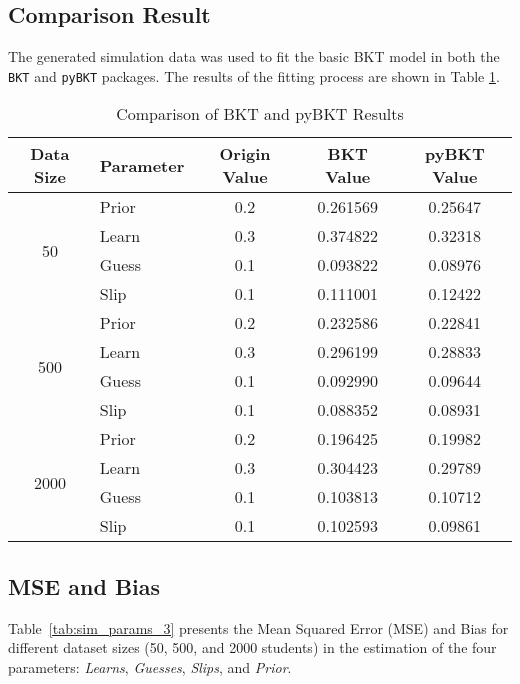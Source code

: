 \documentclass{article}
\begin{document}
\subsection{Comparison Result}
The generated simulation data was used to fit the basic BKT model in both the \texttt{BKT} and \texttt{pyBKT} packages. The results of the fitting process are shown in Table \ref{tab:bkt-comparison}.
\begin{table}[H]
\centering
\caption{Comparison of BKT and pyBKT Results}
\label{tab:bkt-comparison}
\begin{tabular}{@{}clccc@{}}
\toprule
\textbf{Data Size} & \textbf{Parameter} & \textbf{Origin Value} & \textbf{BKT Value} & \textbf{pyBKT Value} \\
\midrule
\multirow{4}{*}{50} 
    & Prior   & 0.2 & 0.261569 & 0.25647 \\
    & Learn   & 0.3 & 0.374822 & 0.32318 \\
    & Guess   & 0.1 & 0.093822 & 0.08976 \\
    & Slip    & 0.1 & 0.111001 & 0.12422 \\
\midrule
\multirow{4}{*}{500} 
    & Prior   & 0.2 & 0.232586 & 0.22841 \\
    & Learn   & 0.3 & 0.296199 & 0.28833 \\
    & Guess   & 0.1 & 0.092990 & 0.09644 \\
    & Slip    & 0.1 & 0.088352 & 0.08931 \\
\midrule
\multirow{4}{*}{2000} 
    & Prior   & 0.2 & 0.196425 & 0.19982 \\
    & Learn   & 0.3 & 0.304423 & 0.29789 \\
    & Guess   & 0.1 & 0.103813 & 0.10712 \\
    & Slip    & 0.1 & 0.102593 & 0.09861 \\
\bottomrule
\end{tabular}
\end{table}
\subsection{MSE and Bias}

Table~\ref{tab:sim_params_3} presents the Mean Squared Error (MSE) and Bias for different dataset sizes (50, 500, and 2000 students) in the estimation of the four parameters: \textit{Learns}, \textit{Guesses}, \textit{Slips}, and \textit{Prior}.
\end{document}
